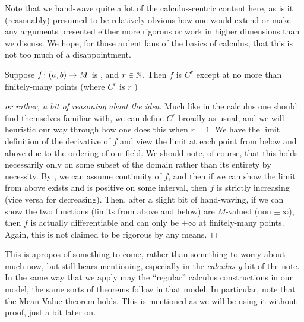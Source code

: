 \newpage

\begin{svgraybox}
  Note that we hand-wave quite a lot of the calculus-centric content here, as is it (reasonably) presumed to be relatively obvious how one would extend or make any arguments presented either more rigorous or work in higher dimensions than we discuss. We hope, for those ardent fans of the basics of calculus, that this is not too much of a disappointment.
\end{svgraybox}


\begin{theorem}
  Suppose $f \colon (a, b) \to M$ is , and $r \in \mathbb{N}$. Then $f$ is $C^{r}$ except at no more than finitely-many points (where $C^r$ is $r$ \contdfblty)
  \label{thm:cont_diff}
\end{theorem}

\begin{proof}[or rather, a bit of reasoning about the idea]
Much like in the calculus one should find themselves familiar with, we can define $C^r$ broadly as usual, and we will heuristic our way through how one does this when $r=1$. We have the limit definition of the derivative of $f$ and view the limit at each point from below and above due to the ordering of our field. We should note, of course, that this holds necessarily only on some subset of the domain rather than its entirety by necessity. By \Mt, we can assume continuity of $f$, and then if we can show the limit from above exists and is positive on some interval, then $f$ is strictly increasing (vice versa for decreasing). Then, after a slight bit of hand-waving, if we can show the two functions (limits from above and below) are $M$-valued (non $\pm \infty$), then $f$ is actually differentiable and can only be $\pm \infty$ at finitely-many points. Again, this is not claimed to be rigorous by any means.
\end{proof}

This is apropos of something to come, rather than something to worry about much now, but still bears mentioning, especially in the \textit{calculus-y} bit of the note. In the same way that we apply may the ``regular'' calculus constructions in our model, the same sorts of theorems follow in that model. In particular, note that the Mean Value theorem holds. This is mentioned as we will be using it without proof, just a bit later on.


